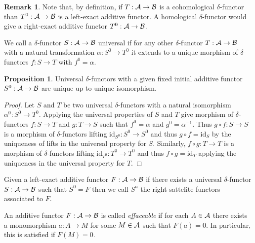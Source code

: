 \documentclass[12pt]{extarticle}
\newcommand{\id}{\mathrm{id}}
\theoremstyle{definition}
\newtheorem{proposition}[theorem]{Proposition}
\newtheorem{remark}{Remark}
\newenvironment{definition}[1][Definition:]{\begin{trivlist}
\item[\hskip \labelsep {\bfseries #1}]}{\end{trivlist}}
\begin{document}
\begin{remark}
Note that, by definition, if $T : \mathcal{A} \to \mathcal{B}$ is a cohomological $\delta$-functor than $T^0 : \mathcal{A} \to \mathcal{B}$ is a left-exact additive functor. A homological $\delta$-functor would give a right-exact additive functor $T^0 : \mathcal{A} \to \mathcal{B}$.
\end{remark}

\begin{definition}
We call a $\delta$-functor $S : \mathcal{A} \to \mathcal{B}$ universal if for any other $\delta$-functor $T : \mathcal{A} \to \mathcal{B}$ with a natural transformation $\alpha : S^0 \to T^0$ it extends to a unique morphism of $\delta$-functors $f : S \to T$ with $f^0 = \alpha$.
\end{definition}

\begin{proposition}
Universal $\delta$-functors with a given fixed initial additive functor $S^0 : \mathcal{A} \to \mathcal{B}$ are unique up to unique isomorphism. 
\end{proposition}

\begin{proof}
Let $S$ and $T$ be two universal $\delta$-functors with a natural isomorphism $\alpha^0 : S^0 \to T^0$. Applying the universal properties of $S$ and $T$ give morphism of $\delta$-functors $f : S \to T$ and $g : T \to S$ such that $f^0 = \alpha$ and $g^0 = \alpha^{-1}$. Thus $g \circ f : S \to S$ is a morphism of $\delta$-functors lifting $\id_{S^0} : S^0 \to S^0$ and thus $g \circ f = \id_S$ by the uniqueness of lifts in the universal property for $S$. Similarly, $f \circ g : T \to T$ is a morphism of $\delta$-functors lifting $\id_{T^0} : T^0 \to T^0$ and thus $f \circ g = \id_{T}$ applying the uniqueness in the universal property for $T$.  
\end{proof}

\begin{definition}
Given a left-exact additive functor $F : \mathcal{A} \to \mathcal{B}$ if there exists a universal $\delta$-functor $S : \mathcal{A} \to \mathcal{B}$ such that $S^0 = F$ then we call $S^n$ the right-sattelite functors associated to $F$. 
\end{definition}

\begin{definition}
An additive functor $F : \mathcal{A} \to \mathcal{B}$ is called \textit{effaceable} if for each $A \in \mathcal{A}$ there exists a monomorphism $a : A \to M$ for some $M \in \mathcal{A}$ such that $F(a) = 0$. In particular, this is satisfied if $F(M) = 0$. 
\end{definition}
\end{document}
